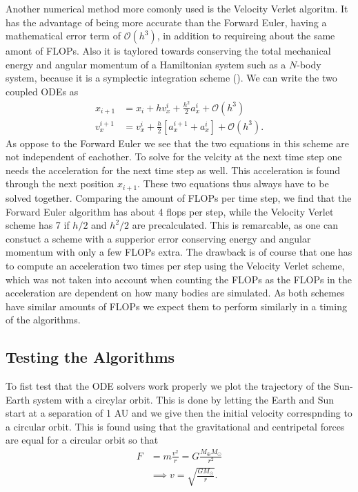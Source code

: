 \documentclass[twocolumn]{aastex62}
\begin{document}
Another numerical method more comonly used is the Velocity Verlet algoritm. It
has the advantage of being more accurate than the Forward Euler, having a
mathematical error term of $\mathcal{O}(h^3)$, in addition to requireing about
the same amont of FLOPs. Also it is taylored towards conserving the total
mechanical energy and angular momentum of a Hamiltonian system such as a
$N$-body system, because it is a symplectic integration scheme (\cite{holmes:2007}). We can write the
two coupled ODEs as 
\begin{align}
    x_{i+1} &= x_i + hv_x^i + \frac{h^2}{2}a_x^i + \mathcal{O}(h^3)\\
    v_x^{i+1} &= v_x^i + \frac{h}{2}[a_x^{i+1} + a_x^i] + \mathcal{O}(h^3).
\end{align}
As oppose to the Forward Euler we see that the two equations in this scheme are
not independent of eachother. To solve for the velcity at the next time step one
needs the acceleration for the next time step as well. This acceleration is
found through the next position $x_{i+1}$. These two equations thus always have
to be solved together. Comparing the amount of FLOPs per time step, we find that
the Forward Euler algorithm has about 4 flops per step, while the Velocity
Verlet scheme has 7 if $h/2$ and $h^2/2$ are precalculated. This is remarcable,
as one can constuct a scheme with a supperior error conserving energy and
angular momentum with only a few FLOPs extra. The drawback is of course that one
has to compute an acceleration two times per step using the Velocity Verlet
scheme, which was not taken into account when counting the FLOPs as the FLOPs in
the acceleration are dependent on how many bodies are simulated.
As both schemes have similar amounts of FLOPs we expect them to perform
similarly in a timing of the algorithms.


\subsection{Testing the Algorithms} \label{subsec:algo_test}
To fist test that the ODE solvers work properly we plot the trajectory of the
Sun-Earth system with a circylar orbit. This is done by letting the Earth and
Sun start at a separation of 1 AU and we give then the initial velocity
correspnding to a circular orbit. This is found using that the gravitational and
centripetal forces are equal for a circular orbit so that 
\begin{align}
    F &= m\frac{v^2}{r} = G\frac{M_\oplus M_\odot}{r^2} \\
    &\implies v = \sqrt{\frac{GM_\odot}{r}}.
\end{align}
\end{document}
